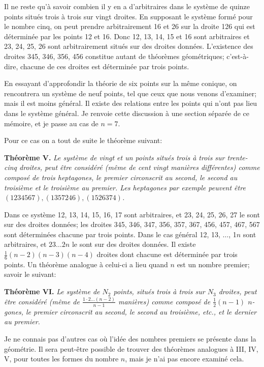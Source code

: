 \documentclass[12pt,a4paper]{article}
\begin{document}
Il ne reste qu'\`a savoir combien il y en a d'arbitraires dans le syst\`eme de quinze points situ\'es trois \`a trois sur vingt droites. En supposant le syst\`eme form\'e pour le nombre cinq, on peut prendre arbitrairement 16 et 26 sur la droite 126 qui est d\'etermin\'ee par les points 12 et 16. Donc 12, 13, 14, 15 et 16 sont arbitraires et 23, 24, 25, 26 sont arbitrairement situ\'es sur des droites donn\'ees. L'existence des droites 345, 346, 356, 456 constitue autant de th\'eor\`emes g\'eom\'etriques; c'est-\`a-dire, chacune de ces droites est d\'etermin\'ee par trois points.

En essayant d'approfondir la th\'eorie de six points sur la m\^eme conique, on rencontrera un syst\`eme de neuf points, tel que ceux que nous venons d'examiner; mais il est moins g\'en\'eral. Il existe des relations entre les points qui n'ont pas lieu dans le syst\`eme g\'en\'eral. Je renvoie cette discussion \`a une section s\'epar\'ee de ce m\'emoire, et je passe au cas de $n = 7$.

Pour ce cas on a tout de suite le th\'eor\`eme suivant:

\textbf{Th\'eor\`eme V.} \emph{Le syst\`eme de vingt et un points situ\'es trois \`a trois sur trente-cinq droites, peut \^etre consid\'er\'e (m\^eme de cent vingt mani\`eres diff\'erentes) comme compos\'e de trois heptagones, le premier circonscrit au second, le second au troisi\`eme et le troisi\`eme au premier. Les heptagones par exemple peuvent \^etre $(1234567), (1357246), (1526374)$.}

Dans ce syst\`eme 12, 13, 14, 15, 16, 17 sont arbitraires, et 23, 24, 25, 26, 27 le sont sur des droites donn\'ees; les droites 345, 346, 347, 356, 357, 367, 456, 457, 467, 567 sont d\'etermin\'ees chacune par trois points. Dans le cas g\'en\'eral 12, 13, $\ldots$, 1$n$ sont arbitraires, et $23 \ldots 2n$ le sont sur des droites donn\'ees. Il existe $\tfrac16(n - 2)(n - 3)(n - 4)$ droites dont chacune est d\'etermin\'ee par trois points. Un th\'eor\`eme analogue \`a celui-ci a lieu quand $n$ est un nombre premier; savoir le suivant:

\textbf{Th\'eor\`eme VI.} \emph{Le syst\`eme de $N_2$ points, situ\'es trois \`a trois sur $N_3$ droites, peut \^etre consid\'er\'e (m\^eme de $\frac{1 \cdot 2 \ldots (n-2)}{n-1}$ mani\`eres) comme compos\'e de $\tfrac12(n - 1)$ $n$-gones, le premier circonscrit au second, le second au troisi\`eme, etc., et le dernier au premier.}

Je ne connais pas d'autres cas o\`u l'id\'ee des nombres premiers se pr\'esente dans la g\'eom\'etrie. Il sera peut-\^etre possible de trouver des th\'eor\`emes analogues \`a III, IV, V, pour toutes les formes du nombre $n$, mais je n'ai pas encore examin\'e cela.
\end{document}
